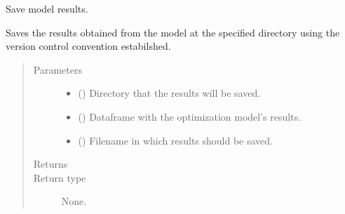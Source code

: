 \documentclass[letterpaper,10pt,english]{sphinxmanual}
\begin{document}

\begin{fulllineitems}
\label{\detokenize{source/optimization.opt_tools:optimization.opt_tools.aux_funcs.save_results}}
Save model results.

Saves the results obtained from the model at the specified directory using the
version control convention estabilshed.
\begin{quote}\begin{description}
\item[{Parameters}] \leavevmode\begin{itemize}
\item {} 
 () \textendash{} Directory that the results will be saved.

\item {} 
 () \textendash{} Dataframe with the optimization model’s results.

\item {} 
 () \textendash{} Filename in which results should be saved.

\end{itemize}

\item[{Returns}] \leavevmode


\item[{Return type}] \leavevmode
None.

\end{description}\end{quote}

\end{fulllineitems}
\end{document}
